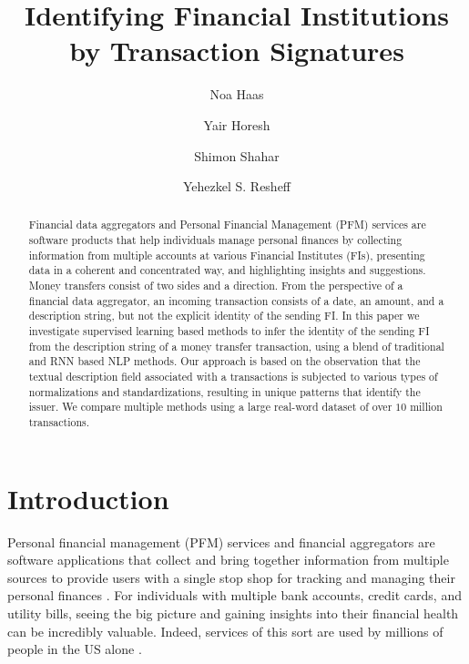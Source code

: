 \documentclass[sigconf]{acmart}
\begin{document}
\title{Identifying Financial Institutions by Transaction Signatures}

\author{Noa Haas} 

\author{Yair Horesh}

\author{Shimon Shahar}

\author{Yehezkel S. Resheff}


\begin{abstract}
Financial data aggregators and Personal Financial Management (PFM) services are software products that help individuals manage personal finances by collecting information from multiple accounts at various Financial Institutes (FIs), presenting data in a coherent and concentrated way, and highlighting insights and suggestions. Money transfers consist of two sides and a direction. From the perspective of a financial data aggregator, an incoming transaction consists of a date, an amount, and a description string, but not the explicit identity of the sending FI. In this paper we investigate supervised learning based methods to infer the identity of the sending FI from the description string of a money transfer transaction, using a blend of traditional and RNN based NLP methods. Our approach is based on the observation that the textual description field associated with a transactions is subjected to various types of normalizations and standardizations, resulting in unique patterns that identify the issuer. We compare multiple methods using a large real-word dataset of over $10$ million transactions.
\end{abstract}



\maketitle

\section{Introduction}

Personal financial management (PFM) services and financial aggregators are software applications that collect and bring together information from multiple sources to provide users with a single stop shop for tracking and managing their personal finances \cite{gupta2014personal}. For individuals with multiple bank accounts, credit cards, and utility bills, seeing the big picture and gaining insights into their financial health can be incredibly valuable. Indeed, services of this sort are used by millions of people in the US alone \cite{green2017account}. 
\end{document}

